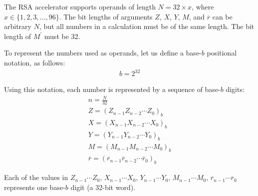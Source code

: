 \documentclass[main\_\_EN.tex]{subfiles}
\begin{document}
The RSA accelerator supports operands of length \begin{math}N = 32 \times x\end{math}, where \begin{math}x \in \{ 1,2,3, \dots, 96\} \end{math}. The bit lengths of arguments \begin{math}Z\end{math}, \begin{math}X\end{math}, \begin{math}Y\end{math}, \begin{math}M\end{math}, and \begin{math}\overline{r}\end{math}
can be arbitrary \begin{math}N\end{math}, but all numbers in a calculation must be of the same length. The bit length of \begin{math}M^{\prime}\end{math} must be 32.

To represent the numbers used as operands, let us define a base-\begin{math}b\end{math} positional notation, as follows:
\begin{gather*}
    b = 2^{32}
\end{gather*}

Using this notation, each number is represented by a sequence of base-\begin{math}b\end{math} digits:
\begin{gather*}
    n = \frac{N}{32} \\
    Z = ( Z_{n-1} Z_{n-2} \cdots Z_{0} )_{b} \\
    X = ( X_{n-1} X_{n-2} \cdots X_{0} )_{b} \\
    Y = ( Y_{n-1} Y_{n-2} \cdots Y_{0} )_{b} \\
    M = ( M_{n-1} M_{n-2} \cdots M_{0} )_{b} \\
    \overline{r} = ( \overline{r}_{n-1} \overline{r}_{n-2} \cdots \overline{r}_{0} )_{b}
\end{gather*}

Each of the values in 
\begin{math}Z_{n-1} \cdots Z_{0}\end{math},
\begin{math}X_{n-1} \cdots X_{0}\end{math},
\begin{math}Y_{n-1} \cdots Y_{0}\end{math},
\begin{math}M_{n-1} \cdots M_{0}\end{math},
\begin{math}\overline{r}_{n-1}\cdots \overline{r}_{0}\end{math} represents one base-\begin{math}b\end{math} digit (a 32-bit word).
\end{document}
